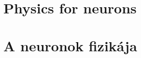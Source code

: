 

\ifx\magyar\undefined
\chapter[Physics for neurons]{Physics for neurons\label{ch:Physics}}
\else
\chapter[A neuronok fizikája]{A neuronok fizikája\label{ch:Physics}}
\fi
\iflatexml
\else
\minitoc
\fi

	
	
	
	




